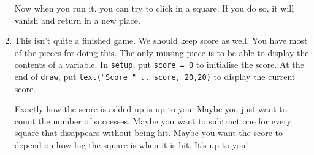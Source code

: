 \documentclass[
  xhtml,%
  text
]{internet}
\begin{document}
\begin{enumerate}
Now when you run it, you can try to click in a square.
If you do so, it will vanish and return in a new place.

\item This isn't quite a finished game.
We should keep score as well.
You have most of the pieces for doing this.
The only missing piece is to be able to display the contents of a variable.
In \verb+setup+, put \verb+score = 0+ to initialise the score.
At the end of \verb+draw+, put \verb+text("Score " .. score, 20,20)+ to display the current score.

Exactly how the score is added up is up to you.
Maybe you just want to count the number of successes.
Maybe you want to subtract one for every square that disappears without being hit.
Maybe you want the score to depend on how big the square is when it is hit.
It's up to you!
                


\end{enumerate}
\end{document}
